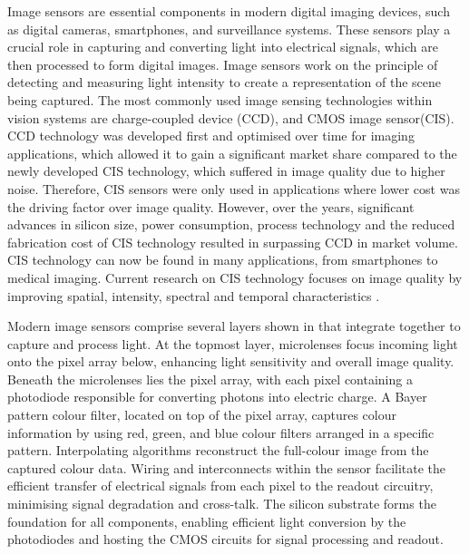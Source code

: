 Image sensors are essential components in modern digital imaging devices, such as digital cameras, smartphones, and surveillance systems. These sensors play a crucial role in capturing and converting light into electrical signals, which are then processed to form digital images. Image sensors work on the principle of detecting and measuring light intensity to create a representation of the scene being captured. The most commonly used image sensing technologies within vision systems are charge-coupled device (CCD)\cite{Smi09}, and CMOS image sensor(CIS)\cite{Fos97}. CCD technology was developed first and optimised over time for imaging applications, which allowed it to gain a significant market share compared to the newly developed CIS technology, which suffered in image quality due to higher noise. Therefore, CIS sensors were only used in applications where lower cost was the driving factor over image quality. However, over the years, significant advances in silicon size, power consumption, process technology and the reduced fabrication cost of CIS technology resulted in surpassing CCD in market volume. CIS technology can now be found in many applications, from smartphones to medical imaging. Current research on CIS technology focuses on image quality by improving spatial, intensity, spectral and temporal characteristics \cite{Gou16}.

Modern image sensors comprise several layers shown in   that integrate together to capture and process light. At the topmost layer, microlenses focus incoming light onto the pixel array below, enhancing light sensitivity and overall image quality. Beneath the microlenses lies the pixel array, with each pixel containing a photodiode responsible for converting photons into electric charge. A Bayer pattern colour filter\cite{BayerPatent}, located on top of the pixel array, captures colour information by using red, green, and blue colour filters arranged in a specific pattern. Interpolating algorithms reconstruct the full-colour image from the captured colour data. Wiring and interconnects within the sensor facilitate the efficient transfer of electrical signals from each pixel to the readout circuitry, minimising signal degradation and cross-talk. The silicon substrate forms the foundation for all components, enabling efficient light conversion by the photodiodes and hosting the CMOS circuits for signal processing and readout. 



